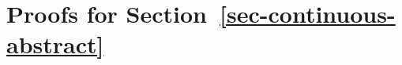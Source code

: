 
\section{Proofs for Section~\ref{sec-continuous-abstract}}
\label{sec-continuous-abstract-proofs}


%
